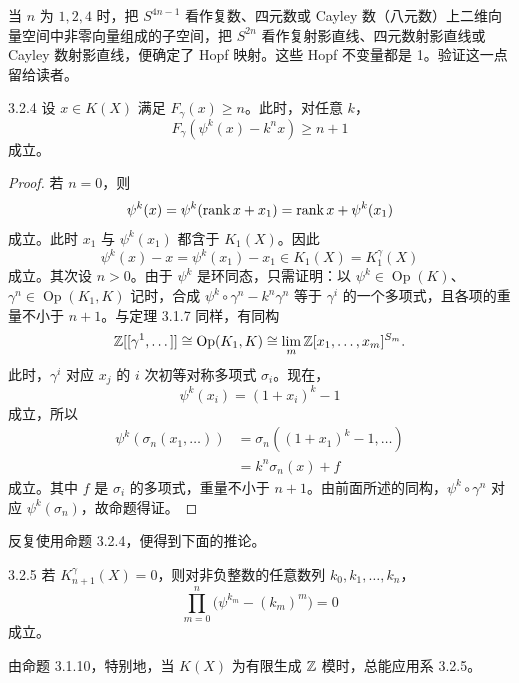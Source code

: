 当 $n$ 为 $1,2,4$ 时，把 $S^{4n-1}$ 看作复数、四元数或 Cayley 数（八元数）上二维向量空间中非零向量组成的子空间，把 $S^{2n}$ 看作复射影直线、四元数射影直线或 Cayley 数射影直线，便确定了 Hopf 映射。这些 Hopf 不变量都是 1。验证这一点留给读者。

\begin{proposition*}{3.2.4}
设 $x\in K(X)$ 满足 $F_\gamma(x)\ge n$。此时，对任意 $k$，
\[
F_\gamma(\psi^k(x)-k^nx)\ge n+1
\]
成立。
\end{proposition*}

\begin{proof}
若 $n=0$，则
\[
\psi^k(x)=\psi^k(\operatorname{rank} x+x_1)=\operatorname{rank} x+\psi^k(x_1)
\]
成立。此时 $x_1$ 与 $\psi^k(x_1)$ 都含于 $K_1(X)$。因此
\[
\psi^k(x)-x=\psi^k(x_1)-x_1\in K_1(X)=K_1^\gamma(X)
\]
成立。其次设 $n>0$。由于 $\psi^k$ 是环同态，只需证明：以 $\psi^k\in\operatorname{Op}(K)$、$\gamma^n\in\operatorname{Op}(K_1,K)$ 记时，合成 $\psi^k\circ\gamma^n-k^n\gamma^n$ 等于 $\gamma^i$ 的一个多项式，且各项的重量不小于 $n+1$。与定理 3.1.7 同样，有同构
\[
\mathbb{Z}[[\gamma^1,\dots]]\cong\operatorname{Op}(K_1,K)\cong\lim_{m}\mathbb{Z}[x_1,\dots,x_m]^{S_m}.
\]
此时，$\gamma^i$ 对应 $x_j$ 的 $i$ 次初等对称多项式 $\sigma_i$。现在，
\[
\psi^k(x_i)=(1+x_i)^k-1
\]
成立，所以
\begin{align*}
\psi^k(\sigma_n(x_1,\dots))&=\sigma_n((1+x_1)^k-1,\dots)\\
&=k^n\sigma_n(x)+f
\end{align*}
成立。其中 $f$ 是 $\sigma_i$ 的多项式，重量不小于 $n+1$。由前面所述的同构，$\psi^k\circ\gamma^n$ 对应 $\psi^k(\sigma_n)$，故命题得证。
\end{proof}

反复使用命题 3.2.4，便得到下面的推论。

\begin{corollary*}{3.2.5}
若 $K_{n+1}^\gamma(X)=0$，则对非负整数的任意数列 $k_0,k_1,\dots,k_n$，
\[
\prod_{m=0}^{n}\bigl(\psi^{k_m}-(k_m)^m\bigr)=0
\]
成立。
\end{corollary*}


由命题 3.1.10，特别地，当 $K(X)$ 为有限生成 $\mathbb{Z}$ 模时，总能应用系 3.2.5。

